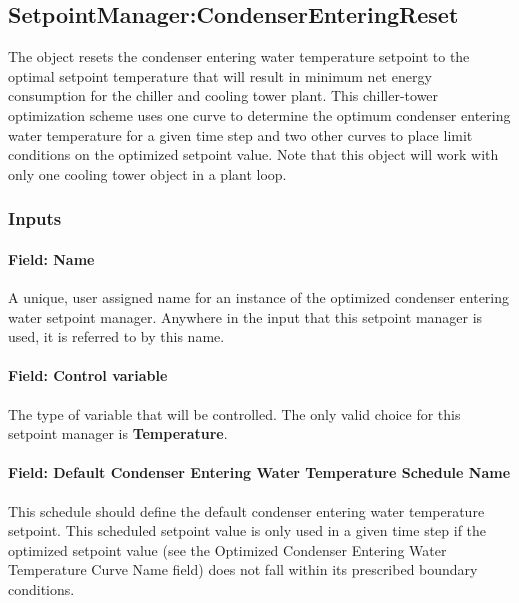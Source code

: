 \subsection{SetpointManager:CondenserEnteringReset}\label{setpointmanagercondenserenteringreset}

The object resets the condenser entering water temperature setpoint to the optimal setpoint temperature that will result in minimum net energy consumption for the chiller and cooling tower plant. This chiller-tower optimization scheme uses one curve to determine the optimum condenser entering water temperature for a given time step and two other curves to place limit conditions on the optimized setpoint value. Note that this object will work with only one cooling tower object in a plant loop.

\subsubsection{Inputs}\label{inputs-23-004}

\paragraph{Field: Name}\label{field-name-23-002}

A unique, user assigned name for an instance of the optimized condenser entering water setpoint manager. Anywhere in the input that this setpoint manager is used, it is referred to by this name.

\paragraph{Field: Control variable}\label{field-control-variable-17}

The type of variable that will be controlled. The only valid choice for this setpoint manager is \textbf{Temperature}.

\paragraph{Field: Default Condenser Entering Water Temperature Schedule Name}\label{field-default-condenser-entering-water-temperature-schedule-name}

This schedule should define the default condenser entering water temperature setpoint. This scheduled setpoint value is only used in a given time step if the optimized setpoint value (see the Optimized Condenser Entering Water Temperature Curve Name field) does not fall within its prescribed boundary conditions.


